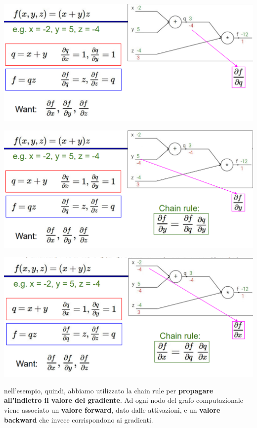 \documentclass[12pt]{article}
\begin{document}
\begin{center}
    \includegraphics[width =1\linewidth]{Images/123.PNG}
\end{center}
\begin{center}
    \includegraphics[width =1\linewidth]{Images/124.PNG}
\end{center}
\begin{center}
    \includegraphics[width =1\linewidth]{Images/125.PNG}
\end{center}
nell'esempio, quindi, abbiamo utilizzato la chain rule per \textbf{propagare all'indietro il valore del gradiente}.
Ad ogni nodo del grafo computazionale viene associato un \textbf{valore forward}, dato dalle attivazioni, e un \textbf{valore backward} che invece corrispondono ai gradienti.
\end{document}

